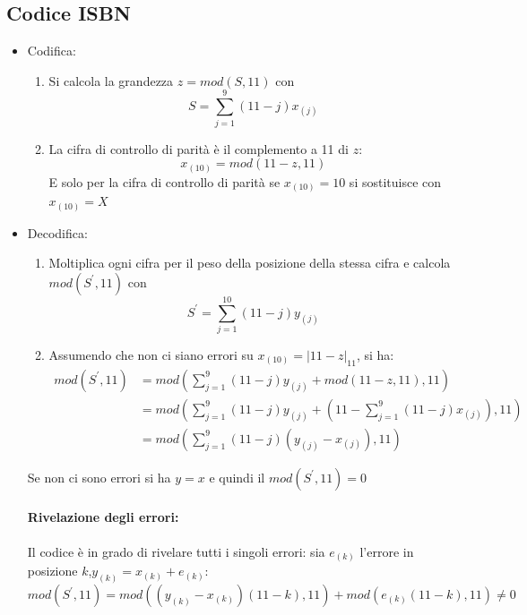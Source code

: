     \subsection{Codice ISBN}
        \begin{itemize}
            \item {Codifica:
                \begin{enumerate}
                    \item {
                        Si calcola la grandezza $z = mod(S,11)$ con
                        \[
                            S = \sum_{j=1}^{9} (11-j)x_{(j)}
                        \]
                    }
                    \item {
                        La cifra di controllo di parità è il complemento a 11 di $z$:
                        \[
                            x_{(10)} = mod(11-z,11)  
                        \]
                        E solo per la cifra di controllo di parità se $x_{(10)} = 10$ si sostituisce con 
                        $x_{(10)} = X$
                    }
                \end{enumerate} 
            }
            \item {Decodifica:
                \begin{enumerate}
                    \item {
                        Moltiplica ogni cifra per il peso della posizione della stessa cifra e calcola $mod(S^\prime,11)$ con
                        \[
                            S^\prime = \sum_{j=1}^{10} (11-j)y_{(j)}
                        \]
                    }
                    \item {
                        Assumendo che non ci siano errori su $x_{(10)} = |11-z|_{11}$, si ha:
                        \begin{align}
                            mod(S^\prime,11) &= mod \left( \sum_{j=1}^{9} (11-j)y_{(j)} + mod(11-z,11),11\right) \nonumber \\
                                            &= mod \left( \sum_{j=1}^{9} (11-j)y_{(j)} + \left(11-\sum_{j=1}^{9} (11-j)x_{(j)}\right),11\right)\nonumber \\
                                            &= mod \left(\sum_{j=1}^{9} (11-j)(y_{(j)}-x_{(j)}),11\right)
                        \end{align}
                    }
                \end{enumerate}
                Se non ci sono errori si ha $y=x$ e quindi il $mod(S^\prime,11) = 0$
                \paragraph{Rivelazione degli errori:} Il codice è in grado di rivelare tutti i singoli errori:
                sia $e_{(k)}$ l'errore in posizione $k$,$y_{(k)} = x_{(k)}+ e_{(k)}$:
                \[
                    mod(S^\prime,11) = mod((y_{(k)}-x_{(k)})(11-k),11)+mod(e_{(k)}(11-k),11) \neq 0
                \]
            }
        \end{itemize}
